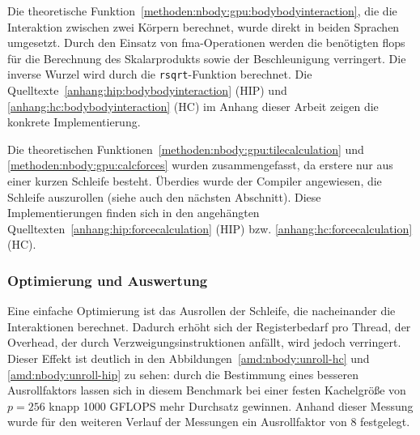 Die theoretische Funktion~\ref{methoden:nbody:gpu:bodybodyinteraction}, die die
Interaktion zwischen zwei Körpern berechnet, wurde direkt in beiden Sprachen
umgesetzt. Durch den Einsatz von \gls{fma}-Operationen werden die benötigten
\gls{flops} für die Berechnung des Skalarprodukts sowie der Beschleunigung
verringert. Die inverse Wurzel wird durch die \texttt{rsqrt}-Funktion berechnet.
Die Quelltexte~\ref{anhang:hip:bodybodyinteraction} (HIP) und
\ref{anhang:hc:bodybodyinteraction} (HC) im Anhang dieser Arbeit zeigen die
konkrete Implementierung.

Die theoretischen Funktionen~\ref{methoden:nbody:gpu:tilecalculation} und
\ref{methoden:nbody:gpu:calcforces} wurden zusammengefasst, da erstere
nur aus einer kurzen Schleife besteht. Überdies wurde der Compiler angewiesen,
die Schleife auszurollen (siehe auch den nächsten Abschnitt). Diese
Implementierungen finden sich in den angehängten
Quelltexten~\ref{anhang:hip:forcecalculation} (HIP) bzw.
\ref{anhang:hc:forcecalculation} (HC).

\subsubsection{Optimierung und Auswertung}

Eine einfache Optimierung ist das Ausrollen der Schleife, die nacheinander die
Interaktionen berechnet. Dadurch erhöht sich der Registerbedarf pro Thread, der
Overhead, der durch Verzweigungsinstruktionen anfällt, wird jedoch verringert.
Dieser Effekt ist deutlich in den Abbildungen~\ref{amd:nbody:unroll-hc} und
\ref{amd:nbody:unroll-hip} zu sehen:  durch die Bestimmung eines besseren
Ausrollfaktors lassen sich in diesem Benchmark bei einer festen Kachelgröße von
$p = 256$ knapp \num{1000} GFLOPS mehr Durchsatz gewinnen. Anhand dieser Messung
wurde für den weiteren Verlauf der Messungen ein Ausrollfaktor von 8 festgelegt.

